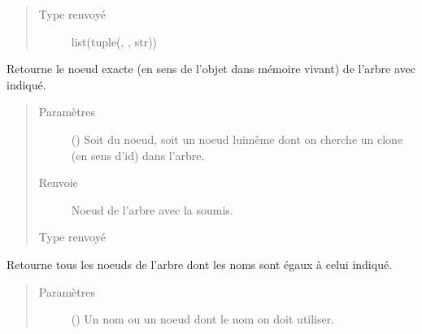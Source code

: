 \documentclass[letterpaper,10pt,french]{sphinxmanual}
\begin{document}
\begin{fulllineitems}
\begin{fulllineitems}
\begin{quote}
\begin{description}
\item[{Type renvoyé}] \leavevmode
list(tuple({\hyperref[\detokenize{index:StrategyTree.NodeST}]{}}, {\hyperref[\detokenize{index:StrategyTree.NodeST}]{}}, str))

\end{description}\end{quote}

\end{fulllineitems}


\begin{fulllineitems}
\label{\detokenize{index:StrategyTree.StrategyTree.get_node}}
Retourne le noeud exacte (en sens de l’objet dans mémoire vivant) de
l’arbre avec  indiqué.
\begin{quote}\begin{description}
\item[{Paramètres}] \leavevmode
{} () \textendash{} Soit  du noeud, soit un noeud lui\sphinxhyphen{}même dont on cherche un clone
(en sens d’id) dans l’arbre.

\item[{Renvoie}] \leavevmode
{} \textendash{} Noeud de l’arbre avec la  soumis.

\item[{Type renvoyé}] \leavevmode
{\hyperref[\detokenize{index:StrategyTree.NodeST}]{}}

\end{description}\end{quote}

\end{fulllineitems}


\begin{fulllineitems}
\label{\detokenize{index:StrategyTree.StrategyTree.get_node_by_name}}
Retourne tous les noeuds de l’arbre dont les noms sont égaux à celui
indiqué.
\begin{quote}\begin{description}
\item[{Paramètres}] \leavevmode
{} () \textendash{} Un nom ou un noeud dont le nom on doit utiliser.


\end{description}
\end{quote}
\end{fulllineitems}
\end{fulllineitems}
\end{document}
